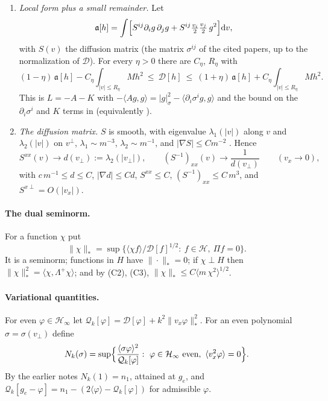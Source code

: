 \documentclass[11pt]{article}
\newcommand{\dd}{\mathrm{d}}
\newcommand{\cD}{\mathcal{D}}
\newcommand{\cH}{\mathcal{H}}
\newcommand{\cQ}{\mathcal{Q}}
\newcommand{\fa}{\mathfrak{a}}
\newcommand{\avg}[1]{\langle #1\rangle}
\newcommand{\nstar}[1]{\|#1\|_*}
\theoremstyle{remark}
\begin{document}
\begin{enumerate}
  \item[(C6)] \emph{Local form plus a small remainder.} Let
    \[
      \fa[h]=\int\Bigl[S^{ij}\partial_ig\,\partial_jg
      +S^{ij}\tfrac{v_i}{2}\tfrac{v_j}{2}\,g^2\Bigr]\dd v ,
    \]
    with $S(v)$ the diffusion matrix (the matrix $\sigma^{ij}$ of the cited
    papers, up to the normalization of $\cD$). For every $\eta>0$ there are
    $C_\eta$, $R_\eta$ with
    \[
      (1-\eta)\,\fa[h]-C_\eta\!\int_{|v|\le R_\eta}\!Mh^2
      \ \le\ \cD[h]\ \le\
      (1+\eta)\,\fa[h]+C_\eta\!\int_{|v|\le R_\eta}\!Mh^2 .
    \]
    This is $L=-A-K$ with $-\langle Ag,g\rangle=|g|_\sigma^2
    -\langle\partial_i\sigma^ig,g\rangle$ and the bound on the
    $\partial_i\sigma^i$ and $K$ terms in \cite[Lemma~7]{StrainGuo}
    (equivalently \cite[Lemma~2.6]{KGH}).
  \item[(C7)] \emph{The diffusion matrix.} $S$ is smooth, with eigenvalue
    $\lambda_1(|v|)$ along $v$ and $\lambda_2(|v|)$ on $v^\perp$,
    $\lambda_1\sim m^{-3}$, $\lambda_2\sim m^{-1}$, and
    $|\nabla S|\le C m^{-2}$ \cite[Lemma~4]{StrainGuo}. Hence
    \[
      S^{xx}(v)\to d(v_\perp):=\lambda_2(|v_\perp|),\qquad
      (S^{-1})_{xx}(v)\to\frac{1}{d(v_\perp)}\qquad(v_x\to0),
    \]
    with $c\,m^{-1}\le d\le C$, $|\nabla d|\le Cd$, $S^{xx}\le C$,
    $(S^{-1})_{xx}\le C\,m^3$, and $S^{x\perp}=O(|v_x|)$.
\end{enumerate}

\paragraph{The dual seminorm.} For a function $\chi$ put
\[
  \nstar{\chi}=\sup\bigl\{\avg{\chi f}/\cD[f]^{1/2}:\ f\in\cH,\ \Pi f=0\bigr\}.
\]
It is a seminorm; functions in $H$ have $\nstar{\cdot}=0$; if $\chi\perp H$
then $\nstar{\chi}^2=\avg{\chi,\Lambda^+\chi}$; and by (C2), (C3),
$\nstar{\chi}\le C\avg{m\,\chi^2}^{1/2}$.

\paragraph{Variational quantities.} For even $\varphi\in\cH_\infty$ let
$\cQ_k[\varphi]=\cD[\varphi]+k^2\nstar{v_x\varphi}^2$. For an even polynomial
$\sigma=\sigma(v_\perp)$ define
\[
  N_k(\sigma)=\sup\Bigl\{\frac{\avg{\sigma\varphi}^2}{\cQ_k[\varphi]}:\
  \varphi\in\cH_\infty\text{ even},\ \avg{v_x^2\varphi}=0\Bigr\}.
\]
By the earlier notes $N_k(1)=n_1$, attained at $g_e$, and
$\cQ_k[g_e-\varphi]=n_1-(2\avg{\varphi}-\cQ_k[\varphi])$ for admissible
$\varphi$.
\end{document}
